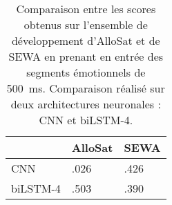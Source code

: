 \begin{table}[htp!]
    \centering
    \begin{tabular}{|l|l|l|}
        \hline
                    &AlloSat &SEWA \\
        \hline
        CNN         &.026   &.426 \\
        biLSTM-4    &.503   &.390 \\
        \hline
    \end{tabular}
    \caption{Comparaison entre les scores obtenus sur l'ensemble de développement d'AlloSat et de SEWA en prenant en entrée des segments émotionnels de 500~ms. Comparaison réalisé sur deux architectures neuronales : CNN et biLSTM-4.}
    \label{tab:pasAnnotation}
\end{table}
